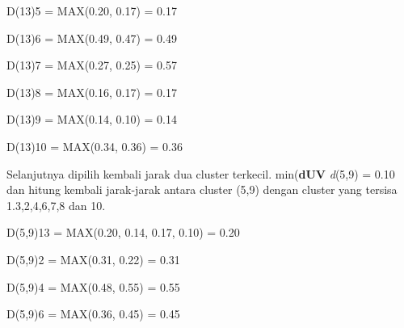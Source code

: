 \begin{enumerate}
D(13)5 = MAX(0.20, 0.17) = 0.17

D(13)6 = MAX(0.49, 0.47) = 0.49

D(13)7 = MAX(0.27, 0.25) = 0.57

D(13)8 = MAX(0.16, 0.17) = 0.17

D(13)9 = MAX(0.14, 0.10) = 0.14

D(13)10 = MAX(0.34, 0.36) = 0.36

\begin{table}[htbp]
\centering
\caption{Matrik Jarak, d(1,3)}
\label{tab:my-table}
\end{table}

Selanjutnya dipilih kembali jarak dua cluster terkecil. min(\textbf{dUV} \textit{d}(5,9) = 0.10 dan hitung kembali jarak-jarak antara cluster (5,9) dengan cluster yang tersisa 1.3,2,4,6,7,8 dan 10.

D(5,9)13 = MAX(0.20, 0.14, 0.17, 0.10) = 0.20

D(5,9)2  = MAX(0.31, 0.22) = 0.31

D(5,9)4 = MAX(0.48, 0.55) = 0.55

D(5,9)6 = MAX(0.36, 0.45) = 0.45


\end{enumerate}
